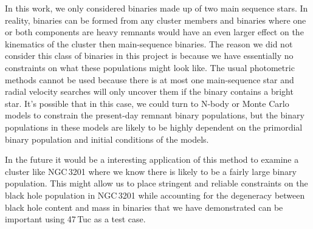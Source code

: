 In this work, we only considered binaries made up of two main sequence stars. In reality, binaries
can be formed from any cluster members and binaries where one or both components are heavy remnants
would have an even larger effect on the kinematics of the cluster then main-sequence binaries. The
reason we did not consider this class of binaries in this project is because we have essentially no
constraints on what these populations might look like. The usual photometric methods cannot be used
because there is at most one main-sequence star and radial velocity searches will only uncover them
if the binary contains a bright star. It's possible that in this case, we could turn to N-body or
Monte Carlo models to constrain the present-day remnant binary populations, but the binary
populations in these models are likely to be highly dependent on the primordial binary population
and initial conditions of the models.

In the future it would be a interesting application of this method to examine a cluster like
NGC\,3201 where we know there is likely to be a fairly large binary population. This might allow us
to place stringent and reliable constraints on the black hole population in NGC\,3201 while
accounting for the degeneracy between black hole content and mass in binaries that we have
demonstrated can be important using 47\,Tuc as a test case.